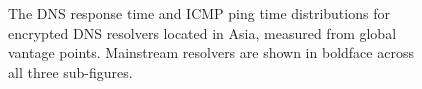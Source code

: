 \begin{figure}[t!]
\begin{minipage}{1.35\textwidth}
\hfill%
%
    \caption{The DNS response time and ICMP ping time distributions for
    encrypted DNS resolvers located in Asia, measured from global vantage points.
    Mainstream resolvers are shown in boldface across all three
    sub-figures.}
\label{fig:dns-asia}
\end{minipage}
\end{figure}

